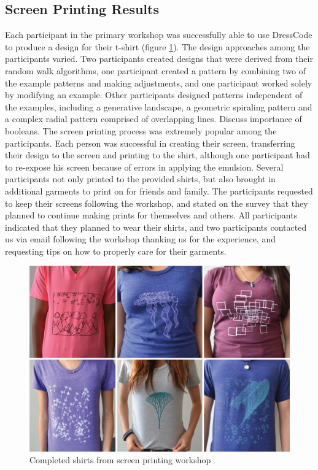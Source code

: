 \documentclass{sigchi}
\begin{document}
\subsection{Screen Printing Results}
Each participant in the primary workshop was successfully able to use DressCode to produce a design for their t-shirt (figure \ref{fig:screen_results}). The design approaches among the participants varied. Two participants created designs that were derived from their random walk algorithms, one participant created a pattern by combining two of the example patterns and making adjustments, and one participant worked solely by modifying an example. Other participants designed patterns independent of the examples, including a generative landscape, a geometric spiraling pattern and a complex radial pattern comprised of overlapping lines. Discuss importance of booleans. The screen printing process was extremely popular among the participants. Each person was successful in creating their screen, transferring their design to the screen and printing to the shirt, although one participant had to re-expose his screen because of errors in applying the emulsion. Several participants not only printed to the provided shirts, but also brought in additional garments to print on for friends and family. The participants requested to keep their screens following the workshop, and stated on the survey that they planned to continue making prints for themselves and others. All participants indicated that they planned to wear their shirts, and two participants contacted us via email following the workshop thanking us for the experience, and requesting tips on how to properly care for their garments. 

\begin{center}
\begin{figure}[h!]
\includegraphics[width=\columnwidth]{images/shirt_results.jpg}
\caption{Completed shirts from screen printing workshop}
\label{fig:screen_results}
\end{figure}
\end{center}
\vspace{-20pt}
\end{document}
